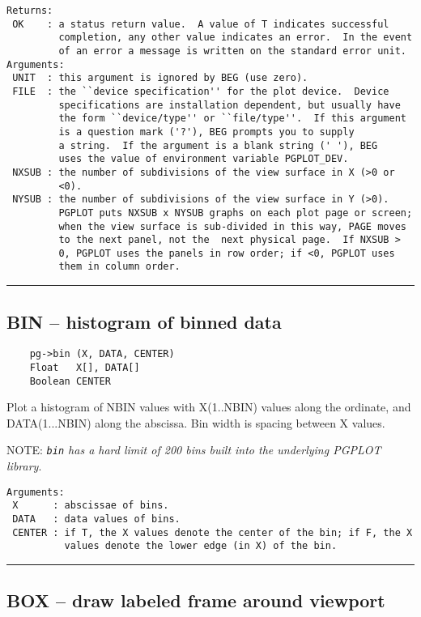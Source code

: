 \begin{verbatim}
Returns:
 OK    : a status return value.  A value of T indicates successful
         completion, any other value indicates an error.  In the event
         of an error a message is written on the standard error unit.
Arguments:
 UNIT  : this argument is ignored by BEG (use zero).
 FILE  : the ``device specification'' for the plot device.  Device 
         specifications are installation dependent, but usually have
         the form ``device/type'' or ``file/type''.  If this argument
         is a question mark ('?'), BEG prompts you to supply
         a string.  If the argument is a blank string (' '), BEG 
         uses the value of environment variable PGPLOT_DEV. 
 NXSUB : the number of subdivisions of the view surface in X (>0 or
         <0). 
 NYSUB : the number of subdivisions of the view surface in Y (>0).
         PGPLOT puts NXSUB x NYSUB graphs on each plot page or screen;
         when the view surface is sub-divided in this way, PAGE moves
         to the next panel, not the  next physical page.  If NXSUB >
         0, PGPLOT uses the panels in row order; if <0, PGPLOT uses
         them in column order.  
\end{verbatim}

\hrule

\subsection*{BIN -- histogram of binned data }

\begin{verbatim}
    pg->bin (X, DATA, CENTER)
    Float   X[], DATA[]
    Boolean CENTER
\end{verbatim}

Plot a histogram of NBIN values with X(1..NBIN) values along the
ordinate, and DATA(1...NBIN) along the abscissa.  Bin width is spacing
between X values.

NOTE: {\em {\tt bin} has a hard limit of 200 bins built into the
underlying PGPLOT library}.

\begin{verbatim}
Arguments:
 X      : abscissae of bins.
 DATA   : data values of bins.
 CENTER : if T, the X values denote the center of the bin; if F, the X
          values denote the lower edge (in X) of the bin.
\end{verbatim}

\hrule

\subsection*{BOX -- draw labeled frame around viewport }

